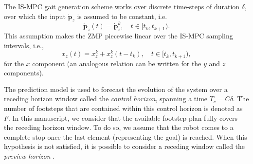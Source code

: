 The IS-MPC gait generation scheme works over discrete time-steps of duration
$\delta$, over which the input $\dot{\bm{p}}_z$ is assumed to be constant, i.e.
\begin{equation*}
    \dot{\bm{p}}_z(t) = \dot{\bm{p}}_z^k,\quad t \in [t_k, t_{k+1}).
\end{equation*}
This assumption makes the ZMP piecewise linear over the IS-MPC sampling intervals,
i.e.,
\begin{equation}
    \label{eq:piecewise-linear-ZMP}
    x_z(t) = x_z^k + x_z^k (t - t_k), \quad t \in [t_k, t_{k+1}),
\end{equation}
for the $x$ component (an analogous relation can be written for the $y$ and $z$
components).

The prediction model is used to forecast the
evolution of the system over a receding horizon window called the
\textit{control horizon}, spanning a time $T_c=C\delta$.
The number of footsteps that are contained
within this control horizon is denoted as $F$. In this manuscript, we consider
that the available footstep plan fully covers the receding horizon window. To
do so, we assume that the robot comes to a complete stop once the
last element (representing the goal) is reached.
When this hypothesis is not satisfied, it is possible to consider a 
receding window called the \textit{preview horizon} \cite{Scianca2020TRO}.

